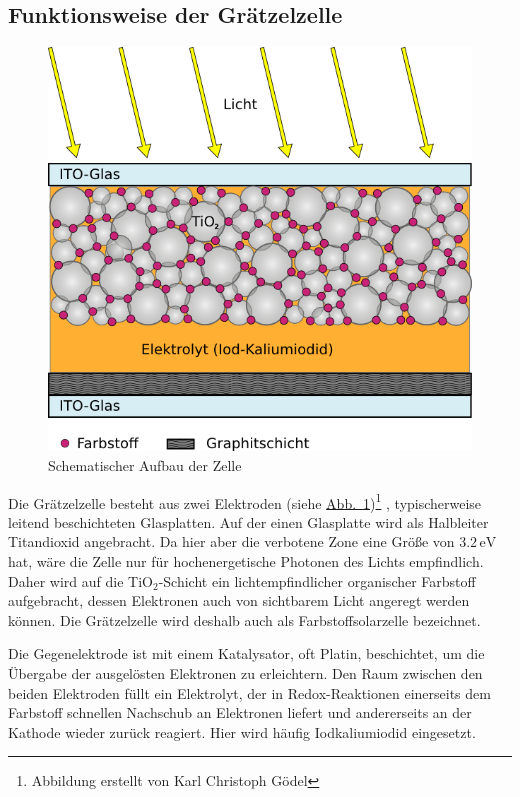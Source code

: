 \documentclass[11pt]{scrartcl}
\newcommand{\unit}[1]{\ensuremath{\,\mathrm{#1}}} %
\begin{document}
\subsection{Funktionsweise der Gr\"atzelzelle}
\begin{figure}[ht]
\begin{center}
\includegraphics[height=0.4\textheight]{images/skizze.png}
\end{center}
\vspace{-1.5\baselineskip}
\caption{Schematischer Aufbau der Zelle}
\label{skizze}
\end{figure}
Die Gr\"atzelzelle besteht aus zwei Elektroden (siehe \hyperref[skizze]{Abb.~\ref{skizze}})\footnote{Abbildung erstellt von Karl Christoph Gödel} , typischerweise leitend beschichteten Glasplatten. Auf der einen Glasplatte wird als Halbleiter Titandioxid angebracht. Da hier aber die verbotene Zone eine Gr\"o\ss{}e von $3.2\unit{eV}$ hat, w\"are die Zelle nur f\"ur hochenergetische Photonen des Lichts empfindlich. Daher wird auf die TiO$_{2}$-Schicht ein lichtempfindlicher organischer Farbstoff aufgebracht, dessen Elektronen auch von sichtbarem Licht angeregt werden k\"onnen. Die Gr\"atzelzelle wird deshalb auch als Farbstoffsolarzelle bezeichnet.

Die Gegenelektrode ist mit einem Katalysator, oft Platin, beschichtet, um die \"Ubergabe der ausgel\"osten Elektronen zu erleichtern. Den Raum zwischen den beiden Elektroden f\"ullt ein Elektrolyt, der in Redox-Reaktionen einerseits dem Farbstoff schnellen Nachschub an Elektronen liefert und andererseits an der Kathode wieder zur\"uck reagiert. Hier wird h\"aufig Iodkaliumiodid eingesetzt.
\end{document}
